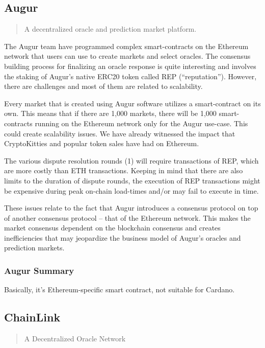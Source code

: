 \documentclass{article}
\begin{document}
\subsection{Augur}

\begin{quote}
    A decentralized oracle and prediction market platform.
\end{quote}

The Augur team have programmed complex smart-contracts on the Ethereum network
that users can use to create markets and select oracles.
The consensus building process for finalizing an oracle response is quite interesting
and involves the staking of Augur’s native ERC20 token called REP (“reputation”).
However, there are challenges and most of them are related to scalability.

Every market that is created using Augur software utilizes a smart-contract on its own.
This means that if there are 1,000 markets, there will be 1,000 smart-contracts
running on the Ethereum network only for the Augur use-case.
This could create scalability issues.
We have already witnessed the impact that CryptoKitties and popular token sales
have had on Ethereum.

The various dispute resolution rounds (1) will require transactions of REP,
which are more costly than ETH transactions.
Keeping in mind that there are also limits to the duration of dispute rounds,
the execution of REP transactions might be expensive during peak on-chain load-times
and/or may fail to execute in time.

These issues relate to the fact that Augur introduces a consensus protocol
on top of another consensus protocol – that of the Ethereum network.
This makes the market consensus dependent on the blockchain consensus
and creates inefficiencies that may jeopardize the business model of Augur’s oracles
and prediction markets.

\subsubsection{Augur Summary}

Basically, it's Ethereum-specific smart contract, not suitable for Cardano.

\subsection{ChainLink}

\begin{quote}
A Decentralized Oracle Network
\end{quote}
\end{document}
